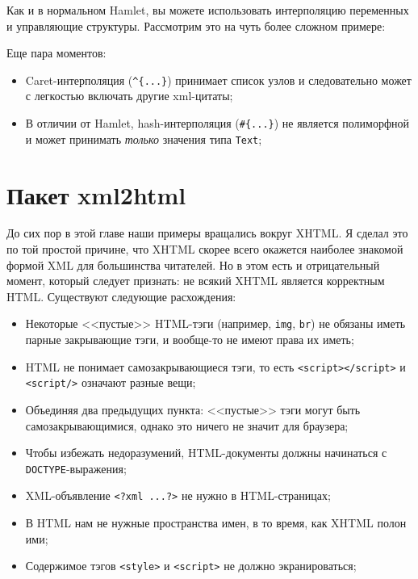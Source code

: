 Как и в нормальном Hamlet, вы можете использовать интерполяцию переменных и управляющие структуры. Рассмотрим это на чуть более сложном примере:


Еще пара моментов:

\begin{itemize}
\item Caret-интерполяция (\verb'^{...}') принимает список узлов и следовательно может с легкостью включать другие xml-цитаты;
\item В отличии от Hamlet, hash-интерполяция (\verb'#{...}') не является полиморфной и может принимать \emph{только} значения типа \lstinline!Text!;
\end{itemize}

\section{Пакет xml2html}

До сих пор в этой главе наши примеры вращались вокруг XHTML. Я сделал это по той простой причине, что XHTML скорее всего окажется наиболее знакомой формой XML для большинства читателей. Но в этом есть и отрицательный момент, который следует признать: не всякий XHTML является корректным HTML. Существуют следующие расхождения:

\begin{itemize}
\item Некоторые <<пустые>> HTML-тэги (например, \lstinline!img!, \lstinline!br!) не обязаны иметь парные закрывающие тэги, и вообще-то не имеют права их иметь;
\item HTML не понимает самозакрывающиеся тэги, то есть \lstinline!<script></script>! и \lstinline!<script/>! означают разные вещи;
\item Объединяя два предыдущих пункта: <<пустые>> тэги могут быть самозакрывающимися, однако это ничего не значит для браузера;
\item Чтобы избежать недоразумений, HTML-документы должны начинаться с \lstinline!DOCTYPE!-выражения;
\item XML-объявление \lstinline!<?xml ...?>! не нужно в HTML-страницах;
\item В HTML нам не нужные пространства имен, в то время, как XHTML полон ими;
\item Содержимое тэгов \lstinline!<style>! и \lstinline!<script>! не должно экранироваться; %
\end{itemize}
  
